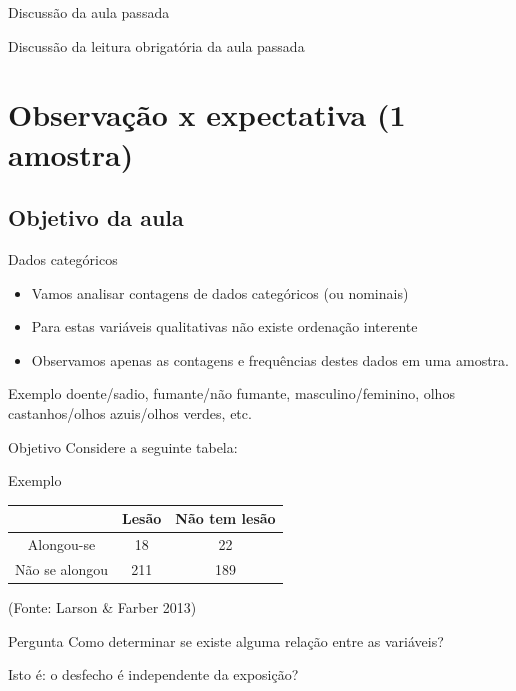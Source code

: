 \documentclass{beamer}
\begin{document}

\begin{frame}{\scriptsize Discussão da aula passada}
  \begin{block}{}
    Discussão da leitura obrigatória da aula passada
  \end{block}
\end{frame}

\section[1 amostra]{Observação x expectativa (1 amostra)}

\subsection{Objetivo da aula}

\begin{frame}{\scriptsize Dados categóricos}
  \begin{itemize}
  \item Vamos analisar contagens de dados categóricos (ou nominais)
  \item Para estas variáveis qualitativas não existe ordenação interente
  \item Observamos apenas as contagens e frequências destes dados em
    uma amostra.
  \end{itemize}
  \begin{exampleblock}{Exemplo}
    \footnotesize
    doente/sadio, fumante/não fumante, masculino/feminino, olhos
    castanhos/olhos azuis/olhos verdes, etc.
  \end{exampleblock}
\end{frame}

\begin{frame}{\scriptsize Objetivo}
  \small
  Considere a seguinte tabela:
  \begin{exampleblock}{Exemplo}
    \footnotesize
    \begin{tabular}{c|c|c}
                 & Lesão & Não tem lesão\\
      \hline
      Alongou-se & 18 & 22\\
      \hline
      Não se alongou & 211 & 189\\
    \end{tabular}

    \bigskip
    {\hfill \scriptsize (Fonte: Larson \& Farber 2013)}
  \end{exampleblock}
  \vfill
  \begin{block}{Pergunta}
    Como determinar se existe alguma relação entre as variáveis?

    \bigskip
    \small
    Isto é: o desfecho é independente da exposição?
  \end{block}
\end{frame}
\end{document}
